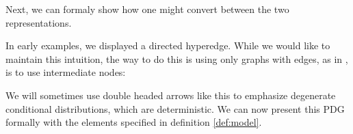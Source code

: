 \documentclass{article}
\numberwithin{equation}{section}
\begin{document}
	Next, we can formaly show how one might convert between the two representations.
		
	\begin{example}[continues=ex:planet]
		In early examples, we displayed a directed hyperedge. While we would like to maintain this intuition, the way to do this is using only graphs with edges, as in , is to use intermediate nodes:
		
		\begin{center}
		\end{center}
		We will sometimes use double headed arrows like this to emphasize degenerate conditional distributions, which are deterministic.
		We can now present this PDG formally with the elements specified in definition \ref{def:model}.
		

\end{example}
\end{document}
